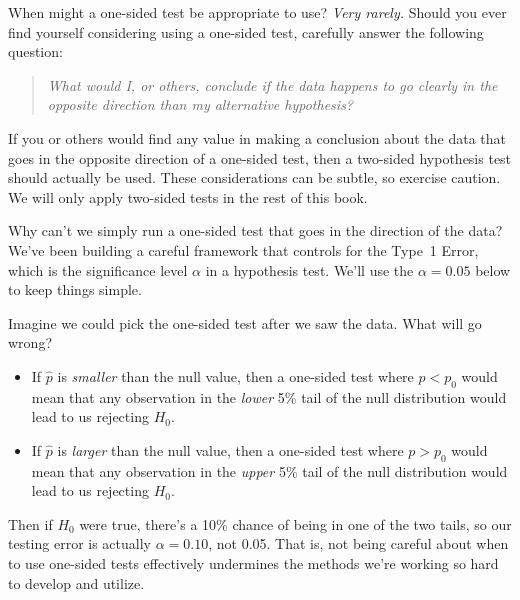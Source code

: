 When might a one-sided test be appropriate to use?
\emph{Very rarely.}
Should you ever find yourself considering using a
one-sided test, carefully answer the following question:
\begin{quote}{\em
  What would I, or others, conclude if the data happens
  to go clearly in the opposite direction than my
  alternative hypothesis?
}\end{quote}
If you or others would find any value in making
a conclusion about the data that goes in the opposite
direction of a one-sided test, then a two-sided hypothesis
test should actually be used.
These considerations can be subtle, so exercise caution.
We will only apply two-sided tests in the rest of
this book. 


\begin{examplewrap}
\begin{nexample}{
    Why can't we simply run a one-sided
    test that goes in the direction of the data?}
  We've been building a careful framework that
  controls for the Type~1 Error, which is the
  significance level $\alpha$ in a hypothesis test.
  We'll use the $\alpha = 0.05$ below to keep
  things simple.

  Imagine we could pick the one-sided test after
  we saw the data. What will go wrong?
  \begin{itemize}
  \item If $\hat{p}$ is \emph{smaller} than
      the null value,
      then a one-sided test where $p < p_0$ would
      mean that any observation in the
      \emph{lower} 5\% tail of the null distribution
      would lead to us rejecting $H_0$.
  \item If $\hat{p}$ is \emph{larger} than
      the null value,
      then a one-sided test where $p > p_0$ would
      mean that any observation in the
      \emph{upper} 5\% tail of the null distribution
      would lead to us rejecting $H_0$.
  \end{itemize}
  Then if $H_0$ were true, there's a 10\% chance of
  being in one of the two tails, so our testing error
  is actually $\alpha = 0.10$, not 0.05.
  That is,
  not being careful about when to use one-sided tests
  effectively undermines the methods we're working
  so hard to develop and utilize.
\end{nexample}
\end{examplewrap}


